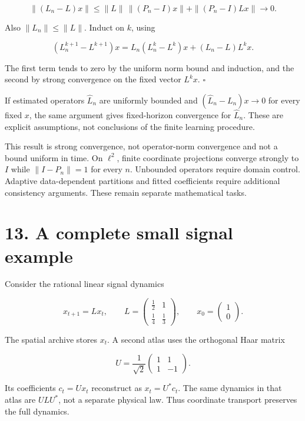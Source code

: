 \documentclass[11pt,letterpaper]{article}
\begin{document}
\[
\|(L_n-L)x\|
\leq\|L\|\,\|(P_n-I)x\|+\|(P_n-I)Lx\|
\longrightarrow0.
\]

Also \(\|L_n\|\leq\|L\|\). Induct on \(k\), using

\[
(L_n^{k+1}-L^{k+1})x
=L_n(L_n^k-L^k)x+(L_n-L)L^kx.
\]

The first term tends to zero by the uniform norm bound and induction,
and the second by strong convergence on the fixed vector \(L^kx\).
\(\square\)

If estimated operators \(\widehat L_n\) are uniformly bounded and
\((\widehat L_n-L_n)x\to0\) for every fixed \(x\), the same argument
gives fixed-horizon convergence for \(\widehat L_n\). These are explicit
assumptions, not conclusions of the finite learning procedure.

This result is strong convergence, not operator-norm convergence and not
a bound uniform in time. On \(\ell^2\), finite coordinate projections
converge strongly to \(I\) while \(\|I-P_n\|=1\) for every \(n\).
Unbounded operators require domain control. Adaptive data-dependent
partitions and fitted coefficients require additional consistency
arguments. These remain separate mathematical tasks.

\section{13. A complete small signal
example}\label{a-complete-small-signal-example}

Consider the rational linear signal dynamics

\[
x_{t+1}=Lx_t,\qquad
L=\begin{pmatrix}\tfrac12&1\\[2pt]\tfrac14&\tfrac13\end{pmatrix},
\qquad x_0=\begin{pmatrix}1\\0\end{pmatrix}.
\]

The spatial archive stores \(x_t\). A second atlas uses the orthogonal
Haar matrix

\[
U=\frac{1}{\sqrt2}\begin{pmatrix}1&1\\1&-1\end{pmatrix}.
\]

Its coefficients \(c_t=Ux_t\) reconstruct as \(x_t=U^*c_t\). The same
dynamics in that atlas are \(ULU^*\), not a separate physical law. Thus
coordinate transport preserves the full dynamics.
\end{document}
